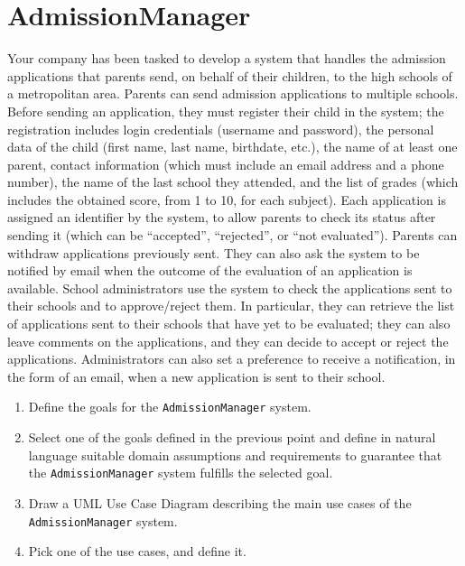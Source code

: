 \section{AdmissionManager}

Your company has been tasked to develop a system that handles the admission applications that parents send, on behalf of their children, to the high schools of a metropolitan
area. Parents can send admission applications to multiple schools. Before sending an application, they must register their child in the system; the registration includes 
login credentials (username and password), the personal data of the child (first name, last name, birthdate, etc.), the name of at least one parent, contact information 
(which must include an email address and a phone number), the name of the last school they attended, and the list of grades (which includes the obtained score, from 1 to 10, 
for each subject). Each application is assigned an identifier by the system, to allow parents to check its status after sending it (which can be “accepted”, “rejected”, or 
“not evaluated”). Parents can withdraw applications previously sent. They can also ask the system to be notified by email when the outcome of the evaluation of an application
is available. School administrators use the system to check the applications sent to their schools and to approve/reject them. In particular, they can retrieve the list of 
applications sent to their schools that have yet to be evaluated; they can also leave comments on the applications, and they can decide to accept or reject the applications.
Administrators can also set a preference to receive a notification, in the form of an email, when a new application is sent to their school.
\begin{enumerate}
    \item Define the goals for the \texttt{AdmissionManager} system.
    \item Select one of the goals defined in the previous point and define in natural language suitable domain assumptions and requirements to guarantee that the 
        \texttt{AdmissionManager} system fulfills the selected goal.
    \item Draw a UML Use Case Diagram describing the main use cases of the \texttt{AdmissionManager} system.
    \item Pick one of the use cases, and define it. 
\end{enumerate}

